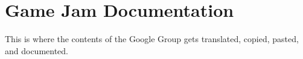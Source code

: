 
\chapter{Game Jam Documentation} %

\label{AppendixC} %


This is where the contents of the Google Group gets translated, copied, pasted, and documented.


